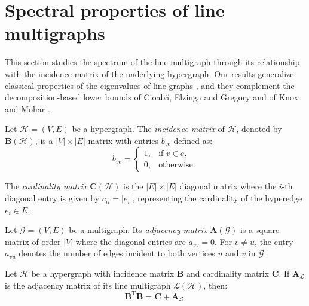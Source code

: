 \documentclass[12pt,reqno]{amsart}
\begin{document}
\section{Spectral properties of line multigraphs}\label{sec:incidence}

This section studies the spectrum of the line multigraph through its relationship with the incidence matrix of the underlying hypergraph. Our results generalize classical properties of the eigenvalues of line graphs \cite{line-spec}, and they complement the decomposition-based lower bounds of Cioabă, Elzinga and Gregory \cite{smallest-eigenvalue} and of Knox and Mohar \cite{knox-mohar}.

\begin{definition}
Let $\mathcal{H} = (V, E)$ be a hypergraph. The \textit{incidence matrix} of $\mathcal{H}$, denoted by $\mathbf{B}(\mathcal{H})$, is a $|V| \times |E|$ matrix with entries $b_{ve}$ defined as:
$$b_{ve} = 
\begin{cases} 
1, & \text{if } v \in e, \\ 
0, & \text{otherwise}. 
\end{cases}$$ 

\noindent The \textit{cardinality matrix} $\mathbf{C}(\mathcal{H})$ is the $|E| \times |E|$ diagonal matrix where the $i$-th diagonal entry is given by $c_{ii} = |e_i|$, representing the cardinality of the hyperedge $e_i \in E$. 
\end{definition}

\begin{definition}
Let $\mathcal{G} = (V, E)$ be a multigraph. Its \textit{adjacency matrix} $\mathbf{A}(\mathcal{G})$ is a square matrix of order $|V|$ where the diagonal entries are $a_{vv} = 0$. For $v \neq u$, the entry $a_{vu}$ denotes the number of edges incident to both vertices $u$ and $v$ in $\mathcal{G}$.
\end{definition}

\begin{theorem}\label{teo:multigrafo}
Let $\mathcal{H}$ be a hypergraph with incidence matrix $\mathbf{B}$ and cardinality matrix $\mathbf{C}$. If $\mathbf{A}_{\mathcal{L}}$ is the adjacency matrix of its line multigraph $\mathcal{L}(\mathcal{H})$, then:
\begin{equation*}
\mathbf{B}^\mathrm{T}\mathbf{B} = \mathbf{C} + \mathbf{A}_{\mathcal{L}}.
\end{equation*}
\end{theorem}
\end{document}
